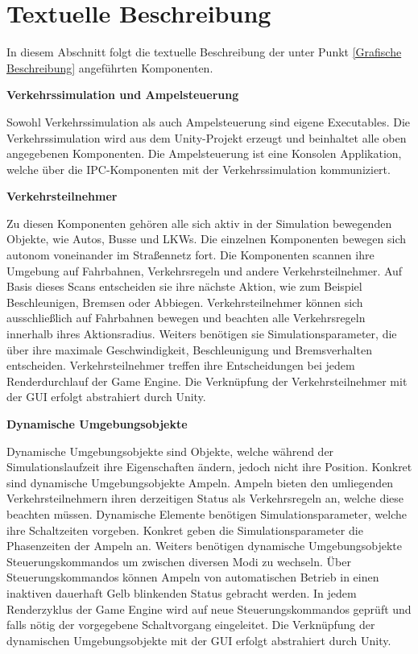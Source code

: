 \section{Textuelle Beschreibung}
\label{Textuelle Beschreibung}

In diesem Abschnitt folgt die textuelle Beschreibung der unter Punkt \ref{Grafische Beschreibung} angeführten Komponenten.

\begin{flushleft}
\textbf{Verkehrssimulation und Ampelsteuerung}
\end{flushleft}
\vspace{-0.3 cm}

Sowohl Verkehrssimulation als auch Ampelsteuerung sind eigene Executables. Die Verkehrssimulation wird aus dem Unity-Projekt erzeugt und beinhaltet alle oben angegebenen Komponenten. Die Ampelsteuerung ist eine Konsolen Applikation, welche über die IPC-Komponenten mit der Verkehrssimulation kommuniziert.

\begin{flushleft}
\textbf{Verkehrsteilnehmer}
\end{flushleft}
\vspace{-0.3 cm}

Zu diesen Komponenten gehören alle sich aktiv in der Simulation bewegenden Objekte, wie Autos, Busse und LKWs. Die einzelnen Komponenten bewegen sich autonom voneinander im Straßennetz fort. Die Komponenten scannen ihre Umgebung auf Fahrbahnen, Verkehrsregeln und andere Verkehrsteilnehmer. Auf Basis dieses Scans entscheiden sie ihre nächste Aktion, wie zum Beispiel Beschleunigen, Bremsen oder Abbiegen. Verkehrsteilnehmer können sich ausschließlich auf Fahrbahnen bewegen und beachten alle Verkehrsregeln innerhalb ihres Aktionsradius. Weiters benötigen sie Simulationsparameter, die über ihre maximale Geschwindigkeit, Beschleunigung und Bremsverhalten entscheiden. Verkehrsteilnehmer treffen ihre Entscheidungen bei jedem Renderdurchlauf der Game Engine. Die Verknüpfung der Verkehrsteilnehmer mit der GUI erfolgt abstrahiert durch Unity.

\begin{flushleft}
\textbf{Dynamische Umgebungsobjekte}
\end{flushleft}
\vspace{-0.3 cm}

Dynamische Umgebungsobjekte sind Objekte, welche während der Simulationslaufzeit ihre Eigenschaften ändern, jedoch nicht ihre Position. Konkret sind dynamische Umgebungsobjekte Ampeln. Ampeln bieten den umliegenden Verkehrsteilnehmern ihren derzeitigen Status als Verkehrsregeln an, welche diese beachten müssen. Dynamische Elemente benötigen Simulationsparameter, welche ihre Schaltzeiten vorgeben. Konkret geben die Simulationsparameter die Phasenzeiten der Ampeln an. Weiters benötigen dynamische Umgebungsobjekte Steuerungskommandos um zwischen diversen Modi zu wechseln. Über Steuerungskommandos können Ampeln von automatischen Betrieb in einen inaktiven dauerhaft Gelb blinkenden Status gebracht werden. In jedem Renderzyklus der Game Engine wird auf neue Steuerungskommandos geprüft und falls nötig der vorgegebene Schaltvorgang eingeleitet. Die Verknüpfung der dynamischen Umgebungsobjekte mit der GUI erfolgt abstrahiert durch Unity.

